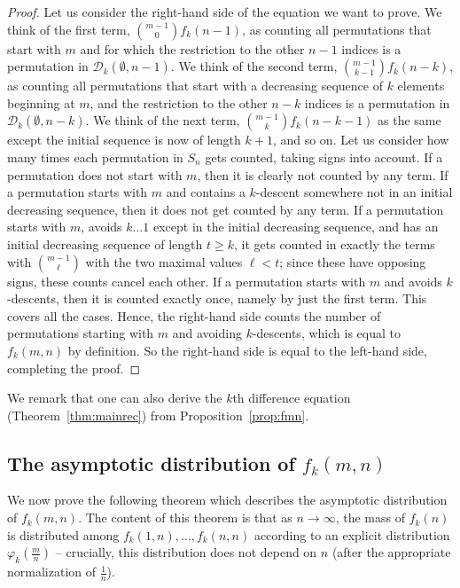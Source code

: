 \documentclass{amsart}
\theoremstyle{definition}
\begin{document}
\begin{proof}
Let us consider the right-hand side of the equation we want to prove. We think of the first term, $\binom{m-1}{0}f_k(n-1)$, as counting all permutations that start with $m$ and for which the restriction to the other $n-1$ indices is a permutation in $\mathcal{D}_k(\emptyset,n-1)$. We think of the second term, $\binom{m-1}{k-1}f_k(n-k)$, as counting all permutations that start with a decreasing sequence of $k$ elements beginning at $m$, and the restriction to the other $n-k$ indices is a permutation in $\mathcal{D}_k(\emptyset,n-k)$. We think of the next term, $\binom{m-1}{k}f_k(n-k-1)$ as the same except the initial sequence is now of length $k+1$, and so on. Let us consider how many times each permutation in $S_n$ gets counted, taking signs into account. If a permutation does not start with $m$, then it is clearly not counted by any term. If a permutation starts with $m$ and contains a $k$-descent somewhere not in an initial decreasing sequence, then it does not get counted by any term. If a permutation starts with $m$, avoids $k\ldots 1$ except in the initial decreasing sequence, and has an initial decreasing sequence of length $t\geq k$, it gets counted in exactly the terms with $\binom{m-1}{\ell}$ with the two maximal values $\ell<t$; since these have opposing signs, these counts cancel each other. If a permutation starts with $m$ and avoids $k$-descents, then it is counted exactly once, namely by just the first term. This covers all the cases. Hence, the right-hand side counts the number of permutations starting with $m$ and avoiding $k$-descents, which is equal to $f_k(m,n)$ by definition. So the right-hand side is equal to the left-hand side, completing the proof.
\end{proof}

We remark that one can also derive the $k$th difference equation (Theorem~\ref{thm:mainrec}) from Proposition~\ref{prop:fmn}.


\subsection{The asymptotic distribution of $f_k(m,n)$}
We now prove the following theorem which describes the asymptotic distribution of $f_k(m,n)$. The content of this theorem is that as $n\to \infty$, the mass of $f_k(n)$ is distributed among $f_k(1,n),\ldots, f_k(n,n)$ according to an explicit distribution $\varphi_k\left(\frac{m}{n}\right)$ -- crucially, this distribution does not depend on $n$ (after the appropriate normalization of $\frac{1}{n}$).
\end{document}
